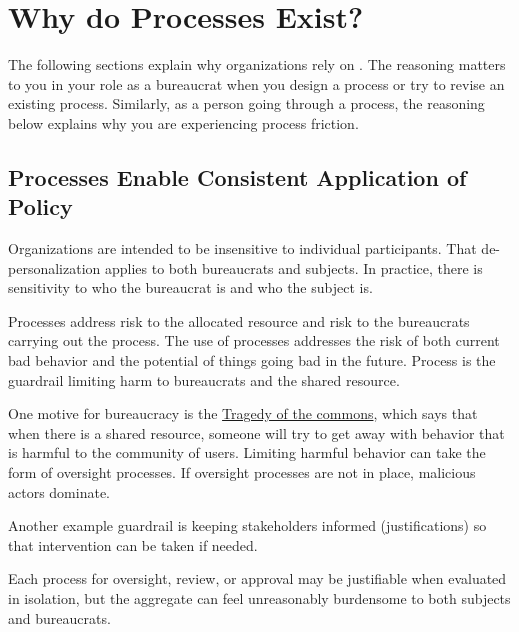 \section{Why do Processes Exist?\label{sec:why-processes-exist}}


The following sections explain why organizations rely on \iftoggle{glossarysubstitutionworks}{\glspl{process}}{processes}. 
The reasoning matters to you in your role as a bureaucrat when you design a process or try to revise an existing process. Similarly, as a person going through a process, the reasoning below explains why you are experiencing \gls{process friction}. 

\subsection*{Processes Enable Consistent Application of Policy}

Organizations are intended to be insensitive to individual participants. That de-personalization applies to both bureaucrats and subjects. In practice, there is sensitivity to who the bureaucrat is and who the subject is. 


Processes address risk to the allocated resource and risk to the bureaucrats carrying out the process.
The use of processes addresses the risk of both current bad behavior and the potential of things going bad in the future. Process is the guardrail limiting harm to bureaucrats and the shared resource. 

One motive for bureaucracy is the \href{https://en.wikipedia.org/wiki/Tragedy_of_the_commons}{Tragedy of the commons}, 
which says that when there is a shared resource, someone will try to get away with behavior that is harmful to the community of users. Limiting harmful behavior can take the form of oversight processes. If oversight processes are not in place, malicious actors dominate.


Another example guardrail is keeping stakeholders informed (justifications) so that intervention can be taken if needed. 

Each process for oversight, review, or approval may be justifiable when evaluated in isolation, but the aggregate can feel unreasonably burdensome to both subjects and bureaucrats.


